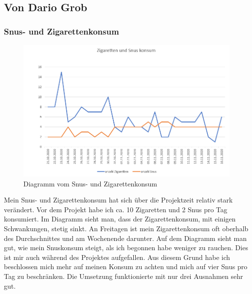 \subsection{Von Dario Grob}
\authortoc{\dario}{\subsectionident}
\subsubsection{Snus- und Zigarettenkonsum}
\begin{figure}[H]
  \centering
  \includegraphics[width=0.7\linewidth]{./images/dario_tabak.PNG}
  \caption{Diagramm vom Snus- und Zigarettenkonsum}
\end{figure}
Mein Snus- und Zigarettenkonsum hat sich über die Projektzeit relativ stark verändert. Vor dem Projekt habe ich ca. 10 Zigaretten und 2 Snus pro Tag konsumiert. Im Diagramm sieht man, dass der Zigarettenkonsum, mit einigen Schwankungen, stetig sinkt. An Freitagen ist mein Zigarettenkonsum oft oberhalb des Durchschnittes und am Wochenende darunter.
\newline
Auf dem Diagramm sieht man gut, wie mein Snuskonsum steigt, als ich begonnen habe weniger zu rauchen. Dies ist mir auch während des Projektes aufgefallen. Aus diesem Grund habe ich beschlossen mich mehr auf meinen Konsum zu achten und mich auf vier Snus pro Tag zu beschränken. Die Umsetzung funktionierte mit nur drei Ausnahmen sehr gut.
